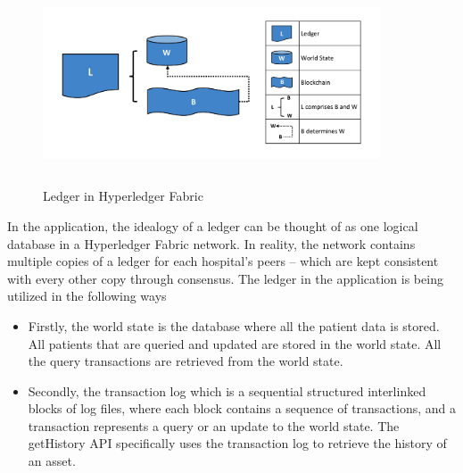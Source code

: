 \begin{figure}[htbp]
 \centering
 \includegraphics[width=10cm, height=6cm]{gfx/figures/ledger.diagram.1.png}
 \caption{Ledger in Hyperledger Fabric \cite{Ledger}}
 \label{fig:chapter03:ledger}
\end{figure}

In the application, the idealogy of a ledger can be thought of as one logical database in a Hyperledger Fabric network. In reality, the network contains multiple copies of a ledger for each hospital's peers – which are kept consistent with every other copy through consensus. The ledger in the application is being utilized in the following ways 
\begin{itemize}
    \item Firstly, the world state is the database where all the patient data is stored. All patients that are queried and updated are stored in the world state. All the query transactions are retrieved from the world state.
    \item Secondly, the transaction log which is a sequential structured interlinked blocks of log files, where each block contains a sequence of transactions, and a transaction represents a query or an update to the world state. The getHistory API specifically  uses the  transaction log to retrieve the history of an asset.
\end{itemize}

